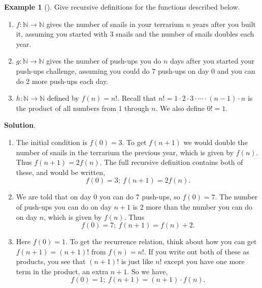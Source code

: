 \documentclass[10pt,]{book}
\theoremstyle{plain}
\theoremstyle{definition}
\theoremstyle{definition}
\newtheorem{example}[theorem]{Example}
\theoremstyle{definition}
\theoremstyle{definition}
\numberwithin{equation}{chapter}
\def\N{\mathbb N}
\begin{document}
\begin{example}[]\label{example-49}
\hypertarget{p-1730}{}%
Give recursive definitions for the functions described below. \leavevmode%
\begin{enumerate}
\item\hypertarget{li-531}{}\hypertarget{p-1731}{}%
\(f:\N \to \N\) gives the number of snails in your terrarium \(n\) years after you built it, assuming you started with 3 snails and the number of snails doubles each year.%
\item\hypertarget{li-532}{}\hypertarget{p-1732}{}%
\(g:\N \to \N\) gives the number of push-ups you do \(n\) days after you started your push-ups challenge, assuming you could do 7 push-ups on day 0 and you can do 2 more push-ups each day.%
\item\hypertarget{li-533}{}\hypertarget{p-1733}{}%
\(h:\N \to \N\) defined by \(f(n) = n!\).  Recall that \(n! = 1 \cdot 2 \cdot 3 \cdot \cdots \cdot (n-1)\cdot n\) is the product of all numbers from \(1\) through \(n\).  We also define \(0! = 1\).%
\end{enumerate}
%
\par\smallskip%
\noindent\textbf{Solution}.\hypertarget{solution-144}{}\quad%
\hypertarget{p-1734}{}%
\leavevmode%
\begin{enumerate}
\item\hypertarget{li-534}{}\hypertarget{p-1735}{}%
The initial condition is \(f(0) = 3\).  To get \(f(n+1)\) we would double the number of snails in the terrarium the previous year, which is given by \(f(n)\).  Thus \(f(n+1) = 2f(n)\).  The full recursive definition contains both of these, and would be written,%
\begin{equation*}
f(0) = 3;~ f(n+1) = 2f(n).
\end{equation*}
%
\item\hypertarget{li-535}{}\hypertarget{p-1736}{}%
We are told that on day 0 you can do 7 push-ups, so \(f(0) = 7\).  The number of push-ups you can do on day \(n+1\) is 2 more than the number you can do on day \(n\), which is given by \(f(n)\).  Thus%
\begin{equation*}
f(0) = 7;~ f(n+1) = f(n) + 2.
\end{equation*}
%
\item\hypertarget{li-536}{}\hypertarget{p-1737}{}%
Here \(f(0) = 1\).  To get the recurrence relation, think about how you can get \(f(n+1) = (n+1)!\) from \(f(n) = n!\).  If you write out both of these as products, you see that \((n+1)!\) is just like \(n!\) except you have one more term in the product, an extra \(n+1\).  So we have,%
\begin{equation*}
f(0) = 1;~ f(n+1) = (n+1)\cdot f(n).
\end{equation*}
%
\end{enumerate}
%
\end{example}
\typeout{************************************************}
\typeout{************************************************}
\end{document}
